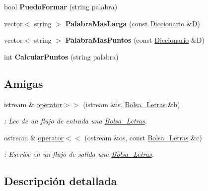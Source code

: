 \begin{DoxyCompactItemize}
\item 
bool {\bfseries Puedo\+Formar} (string palabra)\hypertarget{classBolsa__Letras_a6a611cf986750285ec11da71275199e2}{}\label{classBolsa__Letras_a6a611cf986750285ec11da71275199e2}

\item 
vector$<$ string $>$ {\bfseries Palabra\+Mas\+Larga} (const \hyperlink{classDiccionario}{Diccionario} \&D)\hypertarget{classBolsa__Letras_afdbea74730c798b860d76655f05082c8}{}\label{classBolsa__Letras_afdbea74730c798b860d76655f05082c8}

\item 
vector$<$ string $>$ {\bfseries Palabra\+Mas\+Puntos} (const \hyperlink{classDiccionario}{Diccionario} \&D)\hypertarget{classBolsa__Letras_a81cff895a837816fa37aa573ec9a450d}{}\label{classBolsa__Letras_a81cff895a837816fa37aa573ec9a450d}

\item 
int {\bfseries Calcular\+Puntos} (string palabra)\hypertarget{classBolsa__Letras_a1c3834faeccf9a8906d5b3b120f93106}{}\label{classBolsa__Letras_a1c3834faeccf9a8906d5b3b120f93106}

\end{DoxyCompactItemize}
\subsection*{Amigas}
\begin{DoxyCompactItemize}
\item 
istream \& \hyperlink{classBolsa__Letras_a411e49a5cfaff550ca5f6977ff18efba}{operator$>$$>$} (istream \&is, \hyperlink{classBolsa__Letras}{Bolsa\+\_\+\+Letras} \&b)
\begin{DoxyCompactList}\small\item\em \+: Lee de un flujo de entrada una \hyperlink{classBolsa__Letras}{Bolsa\+\_\+\+Letras}. \end{DoxyCompactList}\item 
ostream \& \hyperlink{classBolsa__Letras_a4467ebafe1a0f889e3fda938465ed12c}{operator$<$$<$} (ostream \&os, const \hyperlink{classBolsa__Letras}{Bolsa\+\_\+\+Letras} \&c)
\begin{DoxyCompactList}\small\item\em \+: Escribe en un flujo de salida una \hyperlink{classBolsa__Letras}{Bolsa\+\_\+\+Letras}. \end{DoxyCompactList}\end{DoxyCompactItemize}


\subsection{Descripción detallada}


